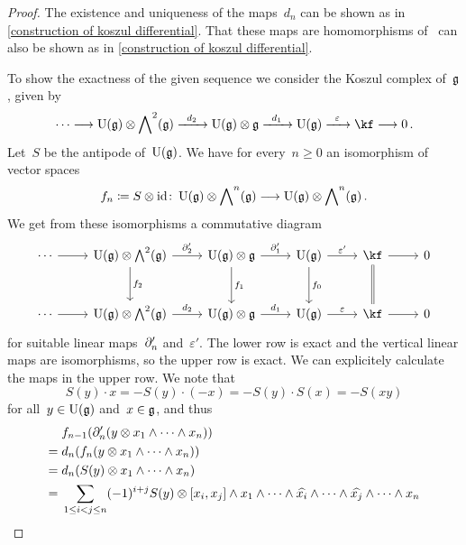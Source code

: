 \begin{proof}
	The existence and uniqueness of the maps~$d_n$ can be shown as in \cref{construction of koszul differential}.
	That these maps are homomorphisms of~\modules{$\Univ(\glie)$} can also be shown as in \cref{construction of koszul differential}.

	To show the exactness of the given sequence we consider the Koszul complex of~$\mathfrak{g}$, given by
	\[
		\dotsb
		\to
		\Univ(\glie) \otimes \Exterior^2(\glie)
		\xto{d_2}
		\Univ(\glie) \otimes \glie
		\xto{d_1}
		\Univ(\glie)
		\xto{\varepsilon}
		\kf
		\to
		0 \,.
	\]
	Let~$S$ be the antipode of~$\Univ(\glie)$.
	We have for every~$n \geq 0$ an isomorphism of vector spaces
	\[
		f_n
		\coloneqq
		S \otimes \id
		\colon
		\Univ(\glie) \otimes \Exterior^n(\glie)
		\to
		\Univ(\glie) \otimes \Exterior^n(\glie) \,.
	\]
	We get from these isomorphisms a commutative diagram
	\[
		\begin{tikzcd}[row sep = large]
			\dotsb
			\arrow{r}
			&
			\Univ(\glie) \otimes \Exterior^2(\glie)
			\arrow{r}[above]{\del'_2}
			\arrow{d}[right]{f_2}
			&
			\Univ(\glie) \otimes \glie
			\arrow{r}[above]{\del'_1}
			\arrow{d}[right]{f_1}
			&
			\Univ(\glie)
			\arrow{r}[above]{\varepsilon'}
			\arrow{d}[right]{f_0}
			&
			\kf
			\arrow{r}
			\arrow[equal]{d}
			&
			0
			\\
			\dotsb
			\arrow{r}
			&
			\Univ(\glie) \otimes \Exterior^2(\glie)
			\arrow{r}[above]{d_2}
			&
			\Univ(\glie) \otimes \glie
			\arrow{r}[above]{d_1}
			&
			\Univ(\glie)
			\arrow{r}[above]{\varepsilon}
			&
			\kf
			\arrow{r}
			&
			0
		\end{tikzcd}
	\]
	for suitable linear maps~$\partial'_n$ and~$\varepsilon'$.
	The lower row is exact and the vertical linear maps are isomorphisms, so the upper row is exact.
	We can explicitely calculate the maps in the upper row.
	We note that
	\[
		S(y) \cdot x
		=
		- S(y) \cdot (-x)
		=
		- S(y) \cdot S(x)
		=
		- S(x y)
	\]
	for all~$y \in \operatorname{U}(\mathfrak{g})$ and~$x \in \mathfrak{g}$, and thus
	\begin{align*}
		{}&
		f_{n-1}( \del'_n( y \otimes x_1 \wedge \dotsb \wedge x_n ) )
		\\
		={}&
		d_n( f_n( y \otimes x_1 \wedge \dotsb \wedge x_n ) )
		\\
		={}&
		d_n( S(y) \otimes x_1 \wedge \dotsb \wedge x_n )
		\\
		={}&
		\sum_{1 \leq i < j \leq n}
		(-1)^{i+j}
		S(y) \otimes
		[x_i, x_j] \wedge
		x_1 \wedge \dotsb \wedge \widehat{x_i} \wedge \dotsb \wedge \widehat{x_j} \wedge \dotsb \wedge x_n

\end{align*}
\end{proof}
